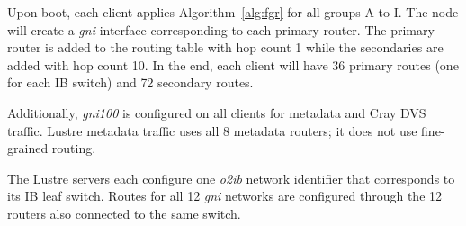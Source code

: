 Upon boot, each client applies Algorithm~\ref{alg:fgr} for all groups A to I.
The node will create a \textit{gni} interface corresponding to each primary
router.  The primary router is added to the routing table with hop count 1
while the secondaries are added with hop count 10.  In the end, each client
will have 36 primary routes (one for each IB switch) and 72 secondary routes.

Additionally, \textit{gni100} is configured on all clients for metadata and
Cray DVS traffic.  Lustre metadata traffic uses all 8 metadata routers; it does
not use fine-grained routing.

The Lustre servers each configure one \textit{o2ib} network identifier that
corresponds to its IB leaf switch.  Routes for all 12 \textit{gni} networks are
configured through the 12 routers also connected to the same switch.

